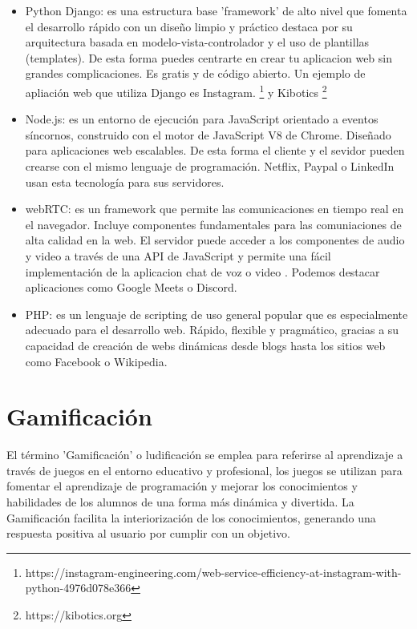 \begin{itemize}
    \item Python Django: es una estructura base 'framework' de alto nivel que fomenta el desarrollo rápido con un diseño limpio y práctico destaca por su arquitectura basada en  modelo-vista-controlador y el uso de plantillas (templates). De esta forma puedes centrarte en crear tu aplicacion web sin grandes complicaciones. Es gratis y de código abierto. Un ejemplo de apliación web que utiliza Django es Instagram.  \footnote{https://instagram-engineering.com/web-service-efficiency-at-instagram-with-python-4976d078e366} y Kibotics \footnote{https://kibotics.org}
    \item Node.js: es un entorno de ejecución para JavaScript orientado a eventos síncornos, construido con el motor de JavaScript V8 de Chrome. Diseñado para aplicaciones web escalables. De esta forma el cliente y el sevidor pueden crearse con el mismo lenguaje de programación. Netflix, Paypal o LinkedIn usan esta tecnología para sus servidores. 
    \item webRTC: es un framework que permite las comunicaciones en tiempo real en el navegador. Incluye componentes fundamentales para las comuniaciones de alta calidad en la web. El servidor puede acceder a los componentes de audio y video a través de una API de JavaScript y permite una fácil implementación de la aplicacion chat de voz o video . Podemos destacar aplicaciones como Google Meets o Discord.
    \item PHP: es un lenguaje de scripting de uso general popular que es especialmente adecuado para el desarrollo web. Rápido, flexible y pragmático, gracias a su capacidad de creación de webs dinámicas desde blogs hasta los sitios web como Facebook o Wikipedia.

\end{itemize}


\section{Gamificación} \label{gamificacion}
 El término 'Gamificación' o ludificación se emplea para referirse al aprendizaje a través de juegos en el entorno educativo y profesional, los juegos se utilizan para fomentar el aprendizaje de programación y mejorar los conocimientos y habilidades de los alumnos de una forma más dinámica y divertida. La Gamificación facilita la interiorización de los conocimientos, generando una respuesta positiva al usuario por cumplir con un objetivo.
 

